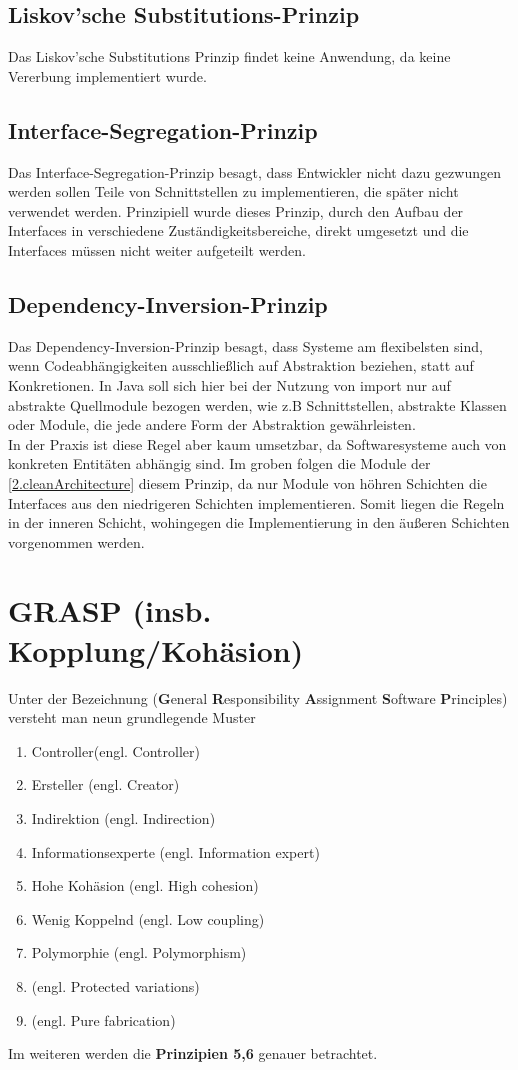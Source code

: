 		\subsection{Liskov’sche Substitutions-Prinzip}
		Das Liskov'sche Substitutions Prinzip findet keine Anwendung, da keine Vererbung implementiert wurde.
		
		\subsection{Interface-Segregation-Prinzip}
		Das Interface-Segregation-Prinzip besagt, dass Entwickler nicht dazu gezwungen werden sollen Teile von Schnittstellen zu implementieren, die später nicht verwendet werden. Prinzipiell wurde dieses Prinzip, durch den Aufbau der Interfaces in verschiedene Zuständigkeitsbereiche, direkt umgesetzt und die Interfaces müssen nicht weiter aufgeteilt werden.
		
		\subsection{Dependency-Inversion-Prinzip}
		Das Dependency-Inversion-Prinzip besagt, dass Systeme am flexibelsten sind, wenn Codeabhängigkeiten ausschließlich auf Abstraktion beziehen, statt auf Konkretionen. In Java soll sich hier bei der Nutzung von import nur auf abstrakte Quellmodule bezogen werden, wie z.B Schnittstellen, abstrakte Klassen oder Module, die jede andere Form der Abstraktion gewährleisten. \\
		In der Praxis ist diese Regel aber kaum umsetzbar, da Softwaresysteme auch von konkreten Entitäten abhängig sind. Im groben folgen die Module der \cref{2.cleanArchitecture} diesem Prinzip, da nur Module von höhren Schichten die Interfaces aus den niedrigeren Schichten implementieren. Somit liegen die Regeln in der inneren Schicht, wohingegen die Implementierung in den äußeren Schichten vorgenommen werden.

	\section{GRASP (insb. Kopplung/Kohäsion)}
	Unter der Bezeichnung  (\textbf{G}eneral \textbf{R}esponsibility \textbf{A}ssignment \textbf{S}oftware \textbf{P}rinciples) versteht man neun grundlegende Muster
	\begin{enumerate}
		\item Controller(engl. Controller)
		\item Ersteller (engl. Creator)
		\item Indirektion (engl. Indirection)
		\item Informationsexperte (engl. Information expert)
		\item Hohe Kohäsion (engl. High cohesion)
		\item Wenig Koppelnd (engl. Low coupling)
		\item Polymorphie (engl. Polymorphism)
		\item (engl. Protected variations)
		\item (engl. Pure fabrication)
	\end{enumerate}
	Im weiteren werden die \textbf{Prinzipien 5,6} genauer betrachtet.
		
